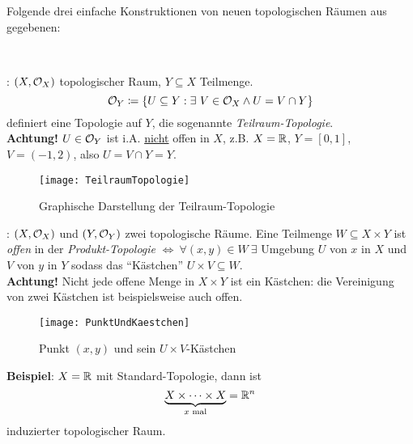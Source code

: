 \begin{remark}
  Folgende drei einfache Konstruktionen von neuen topologischen Räumen aus gegebenen:
  \begin{enumerate}
    \  \\
    \begin{minipage}{.45\textwidth}
      \item {}\label{def:teilraumtopologie}: \( (X, \mathcal{O}_X) \) topologischer Raum, \( Y \subseteq X \) Teilmenge.
        \begin{equation*}
          \mathcal{O}_Y \coloneqq \{ U \subseteq Y : \exists \ V \in \mathcal{O}_X \wedge U = V \cap Y \}
        \end{equation*}
        definiert eine Topologie auf \( Y \), die sogenannte \emph{Teilraum-Topologie}.\footnotemark{} \\
        \textbf{Achtung!} \( U \in \mathcal{O}_Y \) ist i.A. \underline{nicht} offen in \( X \), z.B. \( X = \mathbb{R} \), \( Y = [0,1] \), \( V = (-1, 2) \), also \( U = V \cap Y = Y \).
    \end{minipage}
    \hfill
    \begin{minipage}{.45\textwidth}
      \begin{figure}[H]
        \texttt{[image: TeilraumTopologie]}
        \caption{Graphische Darstellung der Teilraum-Topologie}
      \end{figure}
    \end{minipage}

    \begin{minipage}{.45\textwidth}
      \item {}\label{def:produkttopologie}: \( (X, \mathcal{O}_X) \) und \( (Y, \mathcal{O}_Y) \) zwei topologische Räume. Eine Teilmenge \( W \subseteq X \times Y \) ist \emph{offen} in der \emph{Produkt-Topologie} \( \Leftrightarrow \ \forall (x, y) \in W \ \exists \) Umgebung \( U \) von \( x \) in \( X \) und \( V \) von \( y \) in \( Y \) sodass das ``Kästchen'' \( U \times V \subseteq W \). \\
      \textbf{Achtung!} Nicht jede offene Menge in \( X \times Y \) ist ein Kästchen: die Vereinigung von zwei Kästchen ist beispielsweise auch offen.
    \end{minipage}
    \hfill
    \begin{minipage}{.45\textwidth}
      \begin{figure}[H]
        \texttt{[image: PunktUndKaestchen]}
        \caption{Punkt \( (x,y) \) und sein \( U \times V \)-Kästchen}
      \end{figure}
    \end{minipage}
    \textbf{Beispiel}: \( X = \mathbb{R} \) mit Standard-Topologie, dann ist
    \begin{equation*}
      \underbrace{X \times \cdots \times X}_{x \text{ mal}} = \mathbb{R}^n
    \end{equation*}
    induzierter topologischer Raum.


\end{enumerate}
\end{remark}

